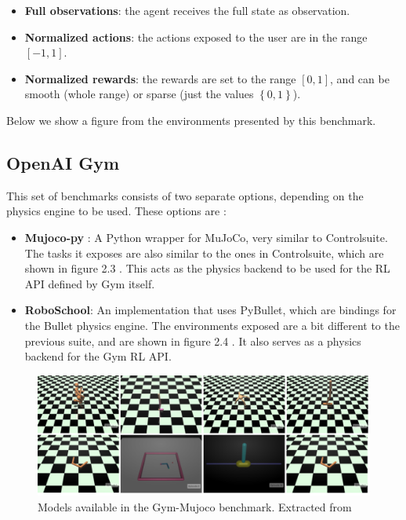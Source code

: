     \begin{itemize}
        \item \textbf{Full observations}: the agent receives the full state as observation.
        \item \textbf{Normalized actions}: the actions exposed to the user are in the range $\left[-1,1\right]$.
        \item \textbf{Normalized rewards}: the rewards are set to the range $\left[ 0, 1 \right]$, and can be smooth (whole range)
                or sparse (just the values $\left\{0,1\right\}$).
    \end{itemize}

    Below we show a figure from the environments presented by this benchmark.

    \figBenchmarkControlsuite

    \subsection{OpenAI Gym}
    This set of benchmarks consists of two separate options, depending on the physics engine to be used. These options are :

    \begin{itemize}
        \item \textbf{Mujoco-py} : A Python wrapper for MuJoCo, very similar to Controlsuite. The tasks it
            exposes are also similar to the ones in Controlsuite, which are shown in figure 2.3 . This acts as
            the physics backend to be used for the RL API defined by Gym itself.
        \item \textbf{RoboSchool}: An implementation that uses PyBullet, which are bindings for the Bullet physics
            engine. The environments exposed are a bit different to the previous suite, and are shown in figure 2.4 . It
            also serves as a physics backend for the Gym RL API.
    \end{itemize}

    \begin{figure}[!ht]
        \centering
        \includegraphics[width=5.5in]{./chapters/imgs/img_openai_gym_mujoco_envs.png}
        \caption[Gym Mujoco models]{Models available in the Gym-Mujoco benchmark. Extracted from \citet{Gym}}
        \label{fig:gym-mujoco-envs}
    \end{figure}

